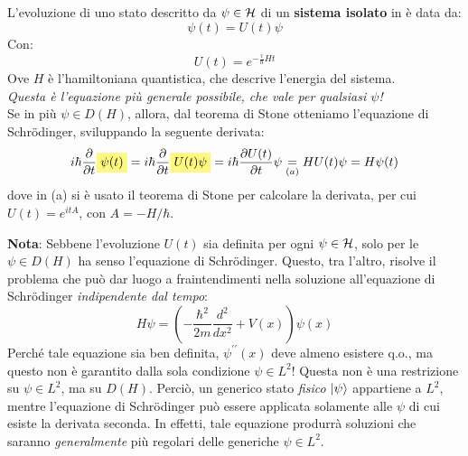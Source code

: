 \documentclass[../../FisicaTeorica.tex]{subfiles}
\begin{document}
\begin{axi}
L'evoluzione di uno stato descritto da $\psi \in \mathcal{H}$ di un \textbf{sistema isolato} in \MQ è data da:
\[
\psi \left(t\right)=U\left(t\right)\psi 
\]
Con:
\[
U\left(t\right)=e^{-\frac{i}{\hbar}Ht}
\]
Ove $H$ è l'hamiltoniana quantistica, che descrive l'energia del sistema.\\
\textit{Questa è l'equazione più generale possibile, che vale per qualsiasi $\psi$!}\\

Se in più $\psi \in D(H)$, allora, dal teorema di Stone otteniamo l'equazione di Schrödinger, sviluppando la seguente derivata:
\[
i\hbar \frac{\partial}{\partial t}\hlc{Yellow}{\psi(t)} =
i\hbar \frac{\partial}{\partial t} \hlc{Yellow}{U(t)\psi}=
 i\hbar \frac{\partial U(t)}{\partial t}\psi \underset{(a)}{=} HU(t)\psi = H\psi(t) 
\]
dove in (a) si è usato il teorema di Stone per calcolare la derivata, per cui $U(t)=e^{itA}$, con $A = -H/\hbar$.
\end{axi}


\textbf{Nota}: Sebbene l'evoluzione $U(t)$ sia definita per ogni $\psi \in \mathcal{H}$, solo per le $\psi \in D(H)$ ha senso l'equazione di Schrödinger. Questo, tra l'altro, risolve il problema che può dar luogo a fraintendimenti nella soluzione all'equazione di Schrödinger \textit{indipendente dal tempo}:
\[
        H\psi =\left(-\frac{\hbar^2}{2m}\frac{d^2}{dx^2}+V\left(x\right)\right)\psi \left(x\right)
\]
        Perché tale equazione sia ben definita, $\psi^{\prime\prime}(x)$ deve almeno esistere q.o., ma questo non è garantito dalla sola condizione $\psi \in L^2$! Questa non è una restrizione su $\psi \in L^2$, ma su $D(H)$. Perciò, un generico stato \textit{fisico} $\Ket{\psi}$ appartiene a $L^2$, mentre l'equazione di Schr\"odinger può essere applicata solamente alle $\psi$ di cui esiste la derivata seconda. In effetti, tale equazione produrrà soluzioni che saranno \textit{generalmente} più regolari delle generiche $\psi \in L^2$.\\
\end{document}
